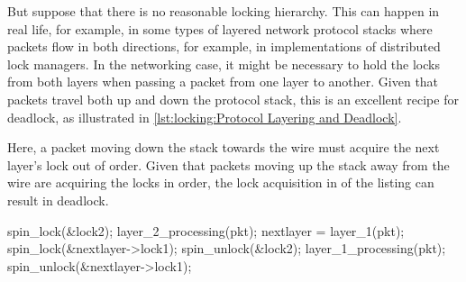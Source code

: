 But suppose that there is no reasonable locking hierarchy.
This can happen in real life, for example, in some types of layered
network protocol stacks where packets flow in both directions, for
example, in implementations of distributed lock managers.
In the networking case, it might be necessary to hold the locks from
both layers when passing a packet from one layer to another.
Given that packets travel both up and down the protocol stack, this
is an excellent recipe for deadlock, as illustrated in
\cref{lst:locking:Protocol Layering and Deadlock}.
\begin{fcvref}
Here, a packet moving down the stack towards the wire must acquire
the next layer's lock out of order.
Given that packets moving up the stack away from the wire are acquiring
the locks in order, the lock acquisition in  of the listing
can result in deadlock.
\end{fcvref}

\begin{listing}
\begin{fcvlabel}
\begin{VerbatimL}[commandchars=\\\{\}]
spin_lock(&lock2);
layer_2_processing(pkt);
nextlayer = layer_1(pkt);
spin_lock(&nextlayer->lock1);	
spin_unlock(&lock2);
layer_1_processing(pkt);
spin_unlock(&nextlayer->lock1);
\end{VerbatimL}
\end{fcvlabel}
\caption{Protocol Layering and Deadlock}
\label{lst:locking:Protocol Layering and Deadlock}
\end{listing}

